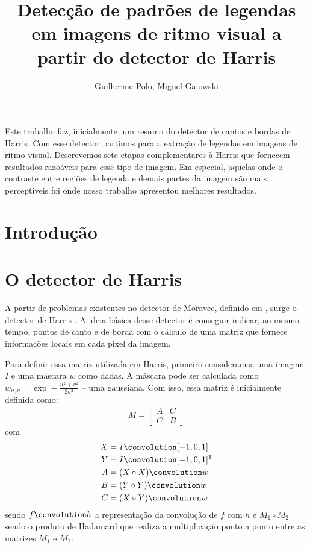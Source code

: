 \documentclass[12pt]{article}
\title{Detecção de padrões de legendas em imagens de ritmo visual a partir
do detector de Harris}
\author{Guilherme Polo\inst{1}, Miguel Gaiowski\inst{1}}
\begin{document}
\maketitle

\begin{resumo}
  Este trabalho faz,  inicialmente, um resumo do detector  de cantos e
  bordas de  Harris.  Com  esse detector partimos  para a  extração de
  legendas  em  imagens  de  ritmo visual.   Descrevemos  sete  etapas
  complementares à Harris que  fornecem resultados razoáveis para esse
  tipo de imagem. Em especial,  aquelas onde o contraste entre regiões
  de legenda e demais partes  da imagem são mais perceptíveis foi onde
  nosso trabalho apresentou melhores resultados.
\end{resumo}


\section{Introdução}

\cite{harris}


\section{O detector de Harris}

A partir de  problemas existentes no detector de  Moravec, definido em
\cite{moravec},  surge o  detector  de Harris  \cite{harris}. A  ideia
básica desse detector  é conseguir indicar, ao mesmo  tempo, pontos de
canto e de  borda com o cálculo de uma  matriz que fornece informações
locais em cada pixel da imagem.



Para definir essa matriz utilizada em Harris, primeiro consideramos uma
imagem $I$ e uma máscara $w$  como dadas. A máscara pode ser calculada
como   $w_{u,v}  =   \exp   -\frac{u^2  +   v^2}{2\sigma^2}$  --   uma
gaussiana. Com isso, essa matriz é inicialmente definida como:
\[
M = \begin{bmatrix}
  A & C \\
  C & B
\end{bmatrix}
\]
com
\begin{align*}
  X & = I \convolution [-1, 0, 1] \\
  Y & = I \convolution [-1, 0, 1]^\intercal \\
  A & = (X \circ X) \convolution w \\
  B & = (Y \circ Y) \convolution w \\
  C & = (X \circ Y) \convolution w
\end{align*}
sendo $f \convolution h$ a  representação da convolução de $f$ com $h$
e  $M_1  \circ  M_2$  sendo  o  produto  de  Hadamard  que  realiza  a
multiplicação ponto a ponto entre as matrizes $M_1$ e $M_2$.
\end{document}
